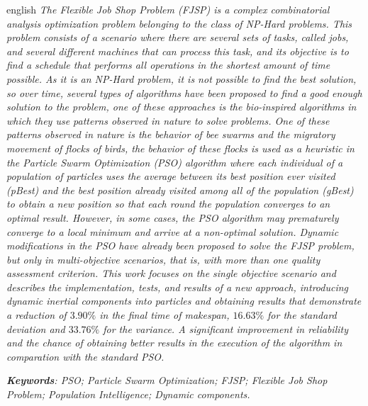 \par

\begin{resumo}[Abstract]
  \begin{otherlanguage*}{english}
    \emph{
      The \textit{Flexible Job Shop Problem} (FJSP) is a complex combinatorial analysis optimization problem belonging to the class of NP-Hard problems. This problem consists of a scenario where there are several sets of tasks, called \textit{jobs}, and several different machines that can process this task, and its objective is to find a schedule that performs all operations in the shortest amount of time possible. As it is an NP-Hard problem, it is not possible to find the best solution, so over time, several types of algorithms have been proposed to find a good enough solution to the problem, one of these approaches is the bio-inspired algorithms in which they use patterns observed in nature to solve problems. One of these patterns observed in nature is the behavior of bee swarms and the migratory movement of flocks of birds, the behavior of these flocks is used as a heuristic in the \textit{Particle Swarm Optimization} (PSO) algorithm where each individual of a population of particles uses the average between its best position ever visited (\textit{pBest}) and the best position already visited among all of the population (\textit{gBest}) to obtain a new position so that each round the population converges to an optimal result. However, in some cases, the PSO algorithm may prematurely converge to a local minimum and arrive at a non-optimal solution. Dynamic modifications in the PSO have already been proposed to solve the FJSP problem, but only in multi-objective scenarios, that is, with more than one quality assessment criterion. This work focuses on the single objective scenario and describes the implementation, tests, and results of a new approach, introducing dynamic inertial components into particles and obtaining results that demonstrate a reduction of $3.90\%$ in the final time of \textit{makespan}, $16.63\%$ for the standard deviation and $33.76\%$ for the variance. A significant improvement in reliability and the chance of obtaining better results in the execution of the algorithm in comparation with the standard PSO.
    }
    \vspace{\onelineskip}

    \noindent
    \emph{	
      \textbf{Keywords}: PSO; Particle Swarm Optimization; FJSP; Flexible Job Shop Problem; Population Intelligence; Dynamic components.
    }
  \end{otherlanguage*}
\end{resumo}

